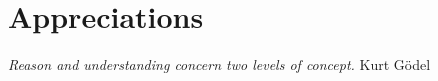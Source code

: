 \chapter*{Appreciations}



\begin{flushright}
\textit{Reason and understanding concern two levels of concept.}
Kurt Gödel
\end{flushright}
